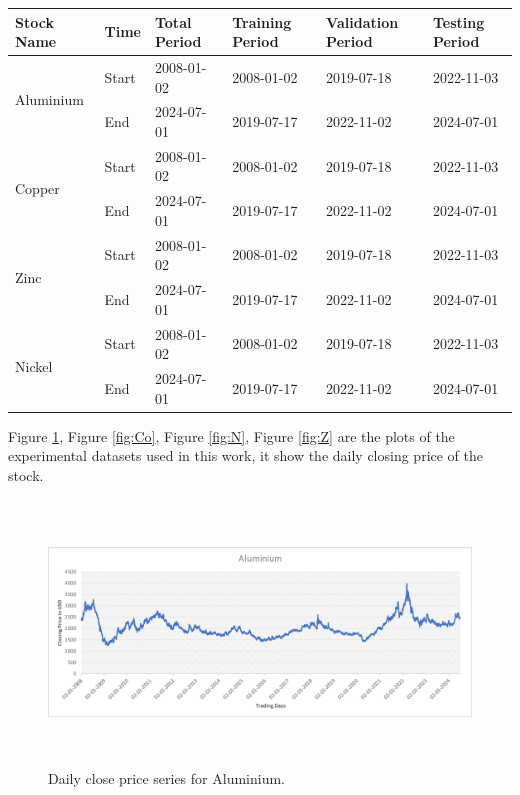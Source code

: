 \documentclass[preprint,12pt]{elsarticle}
\begin{document}
\begin{table}
	{\begin{tabular}{|p{2cm}|p{1cm}|p{2cm}|p{1.5cm}|p{2cm}|p{2cm}|} \hline
			\textbf{Stock Name} & \textbf{Time} & \textbf{Total Period} & \textbf{Training Period} & \textbf{Validation Period}& \textbf{Testing Period}\\ \hline 
			\multirow{2}{*}{Aluminium}&Start & 2008-01-02  &2008-01-02  &2019-07-18&2022-11-03 \\
			&End & 2024-07-01 &2019-07-17 &2022-11-02&2024-07-01\\ \hline
			\multirow{2}{*}{Copper}&Start & 2008-01-02  &2008-01-02  &2019-07-18&2022-11-03 \\
			&End  & 2024-07-01 &2019-07-17 &2022-11-02&2024-07-01\\ \hline
			\multirow{2}{*}{Zinc}&Start & 2008-01-02  &2008-01-02  &2019-07-18&2022-11-03 \\
			&End  & 2024-07-01 &2019-07-17 &2022-11-02&2024-07-01\\ \hline
			\multirow{2}{*}{Nickel}&Start & 2008-01-02  &2008-01-02  &2019-07-18&2022-11-03 \\
			&End  & 2024-07-01 &2019-07-17 &2022-11-02&2024-07-01\\ \hline
	\end{tabular}}
	\label{tab1}
\end{table}

Figure \ref{fig:A}, Figure \ref{fig:Co}, Figure \ref{fig:N}, Figure \ref{fig:Z} are the plots of the experimental datasets used in this work, it show the daily closing price of the stock.

\begin{center}
	\begin{figure}[!htbp]
		\centering
		\includegraphics[width=13cm, height=7cm]{A.png}
		\caption{Daily close price series for Aluminium.}
		\label{fig:A}
	\end{figure}
\end{center}
\end{document}
